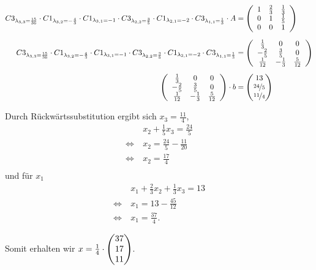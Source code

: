 \documentclass[main.tex]{subfiles}
\begin{document}
\begin{align*}
    C3_{\lambda_{3,3}=\frac{15}{36}} \cdot
    C1_{\lambda_{3,2}=-\frac{4}{3}} \cdot
    C1_{\lambda_{3,1}=-1} \cdot
    C3_{\lambda_{2,2}=\frac{3}{5}} \cdot
    C1_{\lambda_{2,1}=-2} \cdot
    C3_{\lambda_{1,1}=\frac{1}{3}} \cdot
    A
    &=
    \eqmatrix{ccc}{
        1 & \frac{2}{3} & \frac{1}{3} \\
        0 &           1 & \frac{1}{5} \\
        0 &           0 & 1
    }\\[2mm]
    C3_{\lambda_{3,3}=\frac{15}{36}} \cdot
    C1_{\lambda_{3,2}=-\frac{4}{3}} \cdot
    C1_{\lambda_{3,1}=-1} \cdot
    C3_{\lambda_{2,2}=\frac{3}{5}} \cdot
    C1_{\lambda_{2,1}=-2} \cdot
    C3_{\lambda_{1,1}=\frac{1}{3}}
    &=
    \eqmatrix{ccc}{
        \frac{1}{3}  &            0 & 0 \\
        -\frac{2}{5} & \frac{3}{5}  & 0 \\
        \frac{1}{12} & -\frac{1}{3} & \frac{5}{12}
    }\\[2mm]
    \eqmatrix{ccc}{
        \frac{1}{3}  &            0 & 0 \\
        -\frac{2}{5} & \frac{3}{5}  & 0 \\
        \frac{1}{12} & -\frac{1}{3} & \frac{5}{12}
    } \cdot b
    &= \vektor{13\\ \nicefrac{24}{5} \\ \nicefrac{11}{4}}\\
\end{align*}

Durch Rückwärtssubstitution ergibt sich $x_3 = \frac{11}{4}$,
\begin{align*}
                      & x_2 + \frac{1}{5} x_3 = \frac{24}{5} \\
    \Leftrightarrow\  & x_2 = \frac{24}{5} - \frac{11}{20}\\
    \Leftrightarrow\  & x_2 = \frac{17}{4}\\
\end{align*}
und für $x_1$
\begin{align*}
                      & x_1 + \frac{2}{3} x_2 + \frac{1}{3} x_3 = 13 \\
    \Leftrightarrow\  & x_1 = 13 - \frac{45}{12} \\
    \Leftrightarrow\  & x_1 = \frac{37}{4}.
\end{align*}

Somit erhalten wir $x = \frac{1}{4} \cdot \vektor{37\\ 17\\ 11}$.
\end{document}
